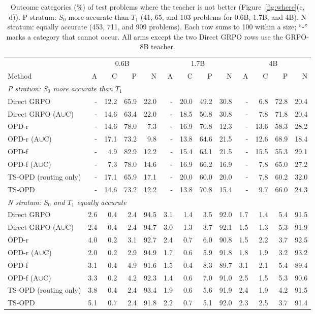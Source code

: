 \documentclass[10pt]{article}
\begin{document}
\begin{table}[h]
\centering
\scriptsize
\setlength{\tabcolsep}{2.8pt}
\caption{Outcome categories (\%) of test problems where the teacher is not
better (Figure~\ref{fig:where}(c, d)). P stratum: $S_0$ more accurate than $T_1$ (41,
65, and 103 problems for 0.6B, 1.7B, and 4B). N stratum: equally accurate (453,
711, and 909 problems). Each row sums to 100 within a size; ``-'' marks a
category that cannot occur. All arms except the two Direct GRPO rows use the GRPO-8B
teacher.}
\label{tab:rq2}
\begin{tabular}{lrrrrrrrrrrrr}
\toprule
 & \multicolumn{4}{c}{0.6B} & \multicolumn{4}{c}{1.7B} & \multicolumn{4}{c}{4B} \\
\cmidrule(lr){2-5}\cmidrule(lr){6-9}\cmidrule(lr){10-13}
Method & A & C & P & N & A & C & P & N & A & C & P & N \\
\midrule
\multicolumn{13}{l}{\textit{P stratum: $S_0$ more accurate than $T_1$}} \\
Direct GRPO & - & 12.2 & 65.9 & 22.0 & - & 20.0 & 49.2 & 30.8 & - & 6.8 & 72.8 & 20.4 \\
Direct GRPO (A$\cup$C) & - & 14.6 & 63.4 & 22.0 & - & 18.5 & 50.8 & 30.8 & - & 7.8 & 71.8 & 20.4 \\
OPD-r & - & 14.6 & 78.0 & 7.3 & - & 16.9 & 70.8 & 12.3 & - & 13.6 & 58.3 & 28.2 \\
OPD-r (A$\cup$C) & - & 17.1 & 73.2 & 9.8 & - & 13.8 & 64.6 & 21.5 & - & 12.6 & 68.9 & 18.4 \\
OPD-f & - & 4.9 & 82.9 & 12.2 & - & 15.4 & 63.1 & 21.5 & - & 15.5 & 55.3 & 29.1 \\
OPD-f (A$\cup$C) & - & 7.3 & 78.0 & 14.6 & - & 16.9 & 66.2 & 16.9 & - & 7.8 & 65.0 & 27.2 \\
TS-OPD (routing only) & - & 17.1 & 65.9 & 17.1 & - & 20.0 & 60.0 & 20.0 & - & 7.8 & 60.2 & 32.0 \\
TS-OPD & - & 14.6 & 73.2 & 12.2 & - & 13.8 & 70.8 & 15.4 & - & 9.7 & 66.0 & 24.3 \\
\midrule
\multicolumn{13}{l}{\textit{N stratum: $S_0$ and $T_1$ equally accurate}} \\
Direct GRPO & 2.6 & 0.4 & 2.4 & 94.5 & 3.1 & 1.4 & 3.5 & 92.0 & 1.7 & 1.4 & 5.4 & 91.5 \\
Direct GRPO (A$\cup$C) & 2.4 & 0.4 & 2.4 & 94.7 & 3.0 & 1.3 & 3.7 & 92.1 & 1.5 & 1.3 & 5.3 & 91.9 \\
OPD-r & 4.0 & 0.2 & 3.1 & 92.7 & 2.4 & 0.7 & 6.0 & 90.8 & 1.5 & 2.2 & 3.7 & 92.5 \\
OPD-r (A$\cup$C) & 2.0 & 0.2 & 2.9 & 94.9 & 1.7 & 0.6 & 5.9 & 91.8 & 1.8 & 1.9 & 3.2 & 93.2 \\
OPD-f & 3.1 & 0.4 & 4.9 & 91.6 & 1.5 & 0.4 & 8.3 & 89.7 & 3.1 & 2.1 & 5.4 & 89.4 \\
OPD-f (A$\cup$C) & 3.3 & 0.2 & 4.2 & 92.3 & 1.4 & 0.6 & 7.0 & 91.0 & 2.5 & 1.5 & 5.3 & 90.6 \\
TS-OPD (routing only) & 3.8 & 0.4 & 2.4 & 93.4 & 1.9 & 0.6 & 5.6 & 91.9 & 2.4 & 1.9 & 4.2 & 91.5 \\
TS-OPD & 5.1 & 0.7 & 2.4 & 91.8 & 2.2 & 0.7 & 5.1 & 92.0 & 2.3 & 2.5 & 3.7 & 91.4 \\
\bottomrule
\end{tabular}


\end{table}
\end{document}
